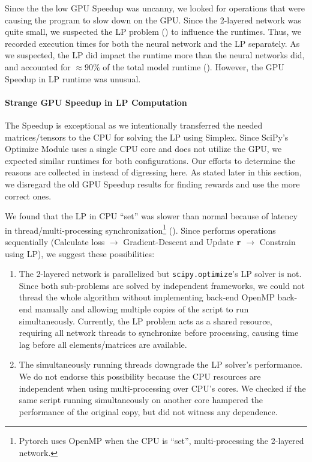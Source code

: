 Since the the low GPU Speedup was uncanny, we looked for operations that were causing the program to slow down on the GPU. Since the 2-layered network was quite small, we suspected the LP problem () to influence the runtimes. Thus, we recorded execution times for both the neural network and the LP separately. As we suspected, the LP did impact the runtime more than the neural networks did, and accounted for $\approx 90 \%$ of the total model runtime (). However, the GPU Speedup in LP runtime was unusual.

\paragraph{Strange GPU Speedup in LP Computation}
The Speedup is exceptional as we intentionally transferred the needed matrices/tensors to the CPU for solving the LP using Simplex. Since SciPy's Optimize Module uses a single CPU core and does not utilize the GPU, we expected similar runtimes for both configurations. Our efforts to determine the reasons are collected in  instead of digressing here. As stated later in this section, we disregard the old GPU Speedup results for finding rewards and use the more correct ones.

We found that the LP in CPU ``set'' was slower than normal because of latency in thread/multi-processing synchronization\footnote{Pytorch uses OpenMP \cite{PTDocs,OpenMP} when the CPU is ``set'', multi-processing the 2-layered network.} (). Since  performs operations sequentially (Calculate loss $\rightarrow$ Gradient-Descent and Update $\mathbf{r}$ $\rightarrow$ Constrain using LP), we suggest these possibilities:
\begin{enumerate}
    \item The 2-layered network is parallelized but \texttt{scipy.optimize}'s LP solver is not. Since both sub-problems are solved by independent frameworks, we could not thread the whole algorithm without implementing back-end OpenMP \cite{OpenMP} back-end manually and allowing multiple copies of the script to run simultaneously. Currently, the LP problem acts as a shared resource, requiring all network threads to synchronize before processing, causing time lag before all elements/matrices are available.
    \item The simultaneously running threads downgrade the LP solver's performance. We do not endorse this possibility because the CPU resources are independent when using multi-processing over CPU's cores. We checked if the same script running simultaneously on another core hampered the performance of the original copy, but did not witness any dependence.
\end{enumerate}

